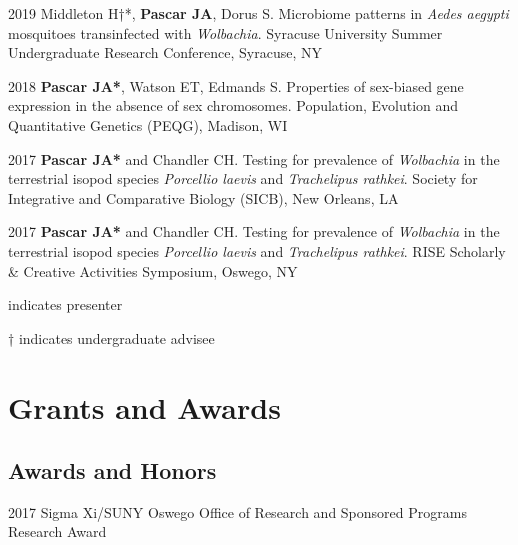 \documentclass[12pt,letterpaper]{report}
\begin{document}
    \begin{tablist}
        
        \item[2019] \tab Middleton H†*, \textbf{Pascar JA}, Dorus S. Microbiome patterns in {{\emph{Aedes aegypti}}} mosquitoes transinfected with {{\emph{Wolbachia}}}. Syracuse University Summer Undergraduate Research Conference, Syracuse, NY
        
        
        \item[2018] \tab \textbf{Pascar JA*}, Watson ET, Edmands S. Properties of sex-biased gene expression in the absence of sex chromosomes. Population, Evolution and Quantitative Genetics (PEQG), Madison, WI
        
        \item[2017] \tab \textbf{Pascar JA*} and Chandler CH. Testing for prevalence of {{\emph{Wolbachia}}} in the terrestrial isopod species {{\emph{Porcellio laevis}}} and {{\emph{Trachelipus rathkei}}}. Society for Integrative and Comparative Biology (SICB), New Orleans, LA
        
        \item[2017] \tab \textbf{Pascar JA*} and Chandler CH. Testing for prevalence of {{\emph{Wolbachia}}} in the terrestrial isopod species {{\emph{Porcellio laevis}}} and {{\emph{Trachelipus rathkei}}}. RISE Scholarly \& Creative Activities Symposium, Oswego, NY
        
        \item * indicates presenter
        \item † indicates undergraduate advisee

        
    \end{tablist}

   
    \section*{Grants and Awards}

    \subsection*{Awards and Honors}

    \begin{tablist}

        \item[2017] \tab Sigma Xi/SUNY Oswego Office of Research and Sponsored Programs Research Award

    \end{tablist}
\end{document}
